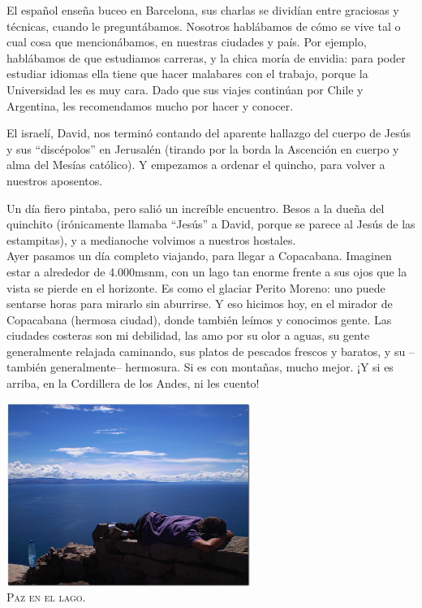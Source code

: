 El español enseña buceo en Barcelona, sus charlas se dividían entre
graciosas y técnicas, cuando le preguntábamos. Nosotros hablábamos de cómo
se vive tal o cual cosa que mencionábamos, en nuestras ciudades y país. Por
ejemplo, hablábamos de que estudiamos carreras, y la chica moría de envidia:
para poder estudiar idiomas ella tiene que hacer malabares con el trabajo,
porque la Universidad les es muy cara. Dado que sus viajes continúan por Chile
y Argentina, les recomendamos mucho por hacer y conocer.

El israelí, David, nos terminó contando del aparente hallazgo del cuerpo de
Jesús y sus ``discépolos'' en Jerusalén (tirando por la borda la Ascención
en cuerpo y alma del Mesías católico). Y empezamos a ordenar el quincho, para
volver a nuestros aposentos.

Un día fiero pintaba, pero salió un increíble encuentro. Besos a la dueña
del quinchito (irónicamente llamaba ``Jesús'' a David, porque se parece al
Jesús de las estampitas), y a medianoche volvimos a nuestros hostales.\\

Ayer pasamos un día completo viajando, para llegar a Copacabana. Imaginen estar
a alrededor de 4.000msnm, con un lago tan enorme frente a sus ojos que la vista
se pierde en el horizonte. Es como el glaciar Perito Moreno: uno puede sentarse
horas para mirarlo sin aburrirse. Y eso hicimos hoy, en el mirador de Copacabana
(hermosa ciudad), donde también leímos y conocimos gente. Las ciudades
costeras son mi debilidad, las amo por su olor a aguas, su gente generalmente
relajada caminando, sus platos de pescados frescos y baratos, y su --también
generalmente-- hermosura. Si es con montañas, mucho mejor. ¡Y
si es arriba, en la Cordillera de los Andes, ni les cuento!

\begin{center} \includegraphics[width=300px]{images/P1160059.JPG} \textsc{\\Paz
en el lago.} \end{center}

